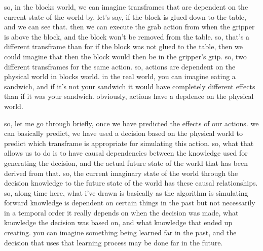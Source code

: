so, in the blocks world, we can imagine transframes that are dependent on the current state of the world by,
let's say, if the block is glued down to the table, and we can see that.
then we can execute the grab action from when the gripper is above the block, and the block won't be removed from the table.
so, that's a different transframe than for if the block was not glued to the table, then we could imagine that then the block would then be in the gripper's grip.
so, two different transframes for the same action.
so, actions are dependent on the physical world in blocks world.
in the real world, you can imagine eating a sandwich, and if it's not your sandwich it would have completely different effects than if it was your sandwich.
obviously, actions have a depdence on the physical world.

so, let me go through briefly, once we have predicted the effects of our actions.
we can basically predict, we have used a decision based on the physical world to predict which transframe is appropriate for simulating this action.
so, what that allows us to do is to have causal dependencies between the knowledge used for generating the decision, and the actual future state of the world that has been derived from that.
so, the current imaginary state of the world through the decision knowledge to the future state of the world has these causal relationships.
so, along time here, what i've drawn is basically as the algorithm is simulating forward knowledge is dependent on certain things in the past but not necessarily in a temporal order it really depends on when the decision was made, what knowledge the decision was based on, and what knowledge that ended up creating.
you can imagine something being learned far in the past, and the decision that uses that learning process may be done far in the future.

